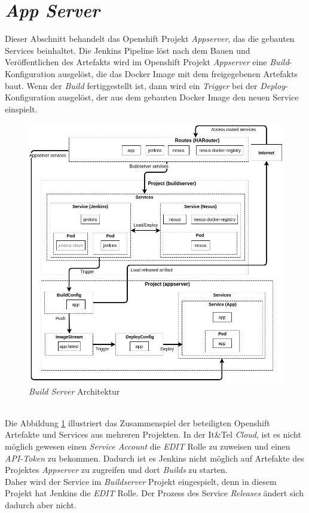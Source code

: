 \section{\emph{App Server}}
\label{sec:appserver}
Dieser Abschnitt behandelt das Openshift Projekt \emph{Appserver}, das die gebauten Services beinhaltet. Die Jenkins Pipeline löst nach dem Bauen und Veröffentlichen des Artefakts wird im Openshift Projekt \emph{Appserver} eine \emph{Build}-Konfiguration ausgelöst, die das Docker Image mit dem freigegebenen Artefakts baut. Wenn der \emph{Build} fertiggestellt ist, dann wird ein \emph{Trigger} bei der \emph{Deploy}-Konfiguration ausgelöst, der aus dem gebauten Docker Image den neuen Service einspielt.  

\begin{figure}[H]
	\centering
	\includegraphics[scale=0.55]{logos/architecture-diagram-appserver.jpg}
	\caption{\emph{Build Server} Architektur}
	\label{fig:appserver-deploy}
\end{figure}
\ \\
Die Abbildung \ref{fig:appserver-deploy} illustriert das Zusammenspiel der beteiligten Openshift Artefakte und Services aus mehreren Projekten. In der It\&Tel \emph{Cloud}, ist es nicht möglich gewesen einen \emph{Service Account} die \emph{EDIT} Rolle zu zuweisen und einen \emph{API-Token} zu bekommen. Dadurch ist es Jenkins nicht möglich auf Artefakte des Projektes \emph{Appserver} zu zugreifen und dort \emph{Builds} zu starten. \\

Daher wird der Service im \emph{Buildserver} Projekt eingespielt, denn in diesem Projekt hat Jenkins die \emph{EDIT} Rolle. Der Prozess des Service \emph{Releases} ändert sich dadurch aber nicht. 